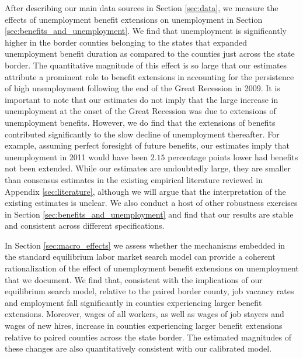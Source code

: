 \documentclass[12pt]{article}
\newcommand{\1}{\mathbf{1}}
\begin{document}
 
After describing our main data sources in Section \ref{sec:data}, we measure the effects of unemployment benefit extensions on unemployment in Section \ref{sec:benefits_and_unemployment}. We find that unemployment is significantly higher in the border counties belonging to the states that expanded unemployment benefit duration as compared to the counties just across the state border. The quantitative magnitude of this effect is so large that our estimates attribute a prominent role to benefit extensions in accounting for the persistence of high unemployment following the end of the Great Recession in 2009. It is important to note that our estimates do not imply that the large increase in unemployment at the onset of the Great Recession was due to extensions of unemployment benefits. However, we do find that the extensions of benefits contributed significantly to the slow decline of unemployment thereafter. For example, assuming perfect foresight of future benefits, our estimates imply that unemployment in 2011 would have been $2.15$ percentage points lower had benefits not been extended. While our estimates are undoubtedly large, they are smaller than consensus estimates in the existing empirical literature reviewed in Appendix \ref{sec:literature}, although we will argue that the interpretation of the existing estimates is unclear. We also conduct a host of other robustness exercises in Section \ref{sec:benefits_and_unemployment} and find that our results are stable and consistent across different specifications.

In Section \ref{sec:macro_effects} we assess whether the mechanisms embedded in the standard equilibrium labor market search model can provide a coherent rationalization of the effect of unemployment benefit extensions on unemployment that we document. We find that, consistent with the implications of our equilibrium search model, relative to the paired border county, job vacancy rates and employment fall significantly in counties experiencing larger benefit extensions. Moreover, wages of all workers, as well as wages of job stayers and wages of new hires, increase in counties experiencing larger benefit extensions relative to paired counties across the state border. The estimated magnitudes of these changes are also quantitatively consistent with our calibrated model.
\end{document}
